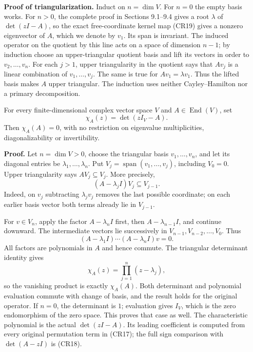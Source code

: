 \documentclass[
  11pt,
]{article}
\begin{document}
\textbf{Proof of triangularization.} Induct on \(n=\dim V\). For \(n=0\)
the empty basis works. For \(n>0\), the complete proof in Sections
9.1--9.4 gives a root \(\lambda\) of \(\det(zI-A)\), so the exact
free-coordinate kernel map (CR19) gives a nonzero eigenvector of \(A\),
which we denote by \(v_1\). Its span is invariant. The induced operator
on the quotient by this line acts on a space of dimension \(n-1\); by
induction choose an upper-triangular quotient basis and lift its vectors
in order to \(v_2,\ldots,v_n\). For each \(j>1\), upper triangularity in
the quotient says that \(Av_j\) is a linear combination of
\(v_1,\ldots,v_j\). The same is true for \(Av_1=\lambda v_1\). Thus the
lifted basis makes \(A\) upper triangular. The induction uses neither
Cayley--Hamilton nor a primary decomposition.

For every finite-dimensional complex vector space \(V\) and
\(A\in\operatorname{End}(V)\), set \[
\chi_A(z)=\det(zI_V-A).
\] Then \(\chi_A(A)=0\), with no restriction on eigenvalue
multiplicities, diagonalizability or invertibility.

\textbf{Proof.} Let \(n=\dim V>0\), choose the triangular basis
\(v_1,\ldots,v_n\), and let its diagonal entries be
\(\lambda_1,\ldots,\lambda_n\). Put
\(V_j=\operatorname{span}(v_1,\ldots,v_j)\), including \(V_0=0\). Upper
triangularity says \(AV_j\subseteq V_j\). More precisely, \[
(A-\lambda_j I)V_j\subseteq V_{j-1}.
\] Indeed, on \(v_j\) subtracting \(\lambda_jv_j\) removes the last
possible coordinate; on each earlier basis vector both terms already lie
in \(V_{j-1}\).

For \(v\in V_n\), apply the factor \(A-\lambda_n I\) first, then
\(A-\lambda_{n-1}I\), and continue downward. The intermediate vectors
lie successively in \(V_{n-1},V_{n-2},\ldots,V_0\). Thus \[
(A-\lambda_1I)\cdots(A-\lambda_nI)v=0.
\] All factors are polynomials in \(A\) and hence commute. The
triangular determinant identity gives \[
\chi_A(z)=\prod_{j=1}^n(z-\lambda_j),
\] so the vanishing product is exactly \(\chi_A(A)\). Both determinant
and polynomial evaluation commute with change of basis, and the result
holds for the original operator. If \(n=0\), the determinant is \(1\);
evaluation gives \(I_V\), which is the zero endomorphism of the zero
space. This proves that case as well. The characteristic polynomial is
the actual \(\det(zI-A)\). Its leading coefficient is computed from
every original permutation term in (CR17); the full sign comparison with
\(\det(A-zI)\) is (CR18).
\end{document}
